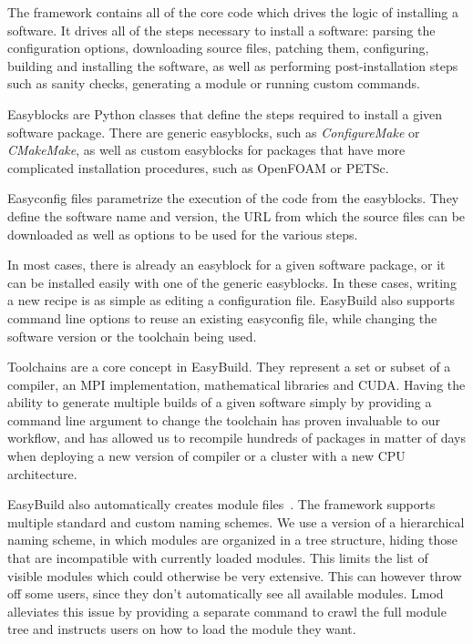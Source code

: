 \documentclass[sigconf]{acmart}
\begin{document}
The framework contains all of the core code which drives the logic of installing a software. It drives all of the steps necessary to install a software: parsing the configuration options, downloading source files, patching them, configuring, building and installing the software, as well as performing post-installation steps such as sanity checks, generating a module or running custom commands. 

Easyblocks are Python classes that define the steps required to install a given software package. There are generic easyblocks, such as {\it ConfigureMake} or {\it CMakeMake}, as well as custom easyblocks for packages that have more complicated installation procedures, such as OpenFOAM or PETSc. 

Easyconfig files parametrize the execution of the code from the easyblocks. They define the software name and version, the URL from which the source files can be downloaded as well as options to be used for the various steps. 

In most cases, there is already an easyblock for a given software package, or it can be installed easily with one of the generic easyblocks. In these cases, writing a new recipe is as simple as editing a configuration file. EasyBuild also supports command line options to reuse an existing easyconfig file, while changing the software version or the toolchain being used. 

Toolchains are a core concept in EasyBuild. They represent a set or subset of a compiler, an MPI implementation, mathematical libraries and CUDA. Having the ability to generate multiple builds of a given software simply by providing a command line argument to change the toolchain has proven invaluable to our workflow, and has allowed us to recompile hundreds of packages in matter of days when deploying a new version of compiler or a cluster with a new CPU architecture. 

EasyBuild also automatically creates module files~\cite{Modules1991,Modules1996,Lmod}. The framework supports multiple standard and custom naming schemes. We use a version of a hierarchical naming scheme, in which modules are organized in a tree structure, hiding those that are incompatible with currently loaded modules. This limits the list of visible modules which could otherwise be very extensive. This can however throw off some users, since they don’t automatically see all available modules. Lmod~\cite{Lmod} alleviates this issue by providing a separate command to crawl the full module tree and instructs users on how to load the module they want.
\end{document}
